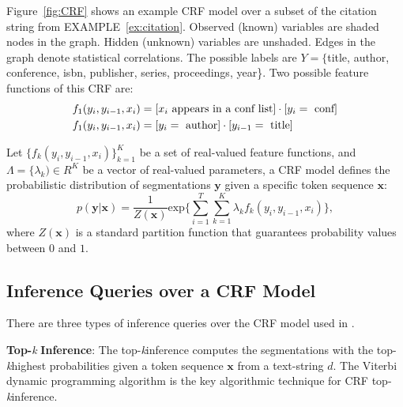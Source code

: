 \begin{example}
Figure~\ref{fig:CRF} shows an example CRF model over a subset of the citation string from EXAMPLE~\ref{ex:citation}.  Observed (known) variables are shaded nodes in the graph.  Hidden (unknown) variables are unshaded.  Edges in the graph denote statistical correlations.  The possible labels are $Y = \{$title, author, conference, isbn, publisher, series, proceedings, year\}.  Two possible feature functions of this CRF are:
\begin{align*}
	\centering
	f_{1}(y_{i}, y_{i-1}, x_{i}) &= [x_{i} \text{ appears in a conf list}] \cdot [y_{i} = \text{ conf}]\\
	f_{1}(y_{i}, y_{i-1}, x_{i}) &= [y_{i} = \text{ author}] \cdot [y_{i-1} = \text{ title}]
\end{align*}
\end{example}
\begin{definition}
Let $\{f_{k}(y_{i},y_{i-1},x_{i})\}^{K}_{k=1}$ be a set of real-valued feature functions, and $\Lambda = \{\lambda_{k}) \in R^{K}$ be a vector of real-valued parameters, a CRF model defines the probabilistic distribution of segmentations $\mathbf{y}$ given a specific token sequence $\mathbf{x}$:
\begin{equation}
\label{eq:CRFmodel}
p(\mathbf{y} | \mathbf{x}) = \frac{1}{Z(\mathbf{x})}\text{exp}\{\sum_{i=1}^{T}\sum_{k=1}^{K}\lambda_{k}f_{k}(y_{i},y_{i-1},x_{i})\}, 
\end{equation}
where $Z(\mathbf{x})$ is a standard partition function that guarantees probability values between $0$ and $1$.
\end{definition}

\subsection{Inference Queries over a CRF Model}
\newcommand{\topk}{top-\textit{k}}
There are three types of inference queries over the CRF model \cite{} used in \sysName .

\textbf{Top-}\textit{k}\textbf{ Inference}: The \topk inference computes the segmentations with the \topk highest probabilities given a token sequence $\mathbf{x}$ from a text-string $d$.  The Viterbi dynamic programming algorithm \cite{} is the key algorithmic technique for CRF \topk inference.

